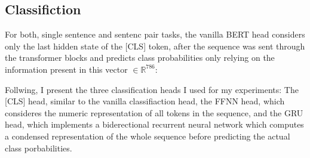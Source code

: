 \subsection{Classifiction}






For both, single sentence and sentenc pair tasks, the vanilla BERT head considers
only the last hidden state of the [CLS] token, after the sequence was sent through
the transformer blocks and predicts class probabilities only relying on the
information present in this vector $\in \mathbb{R}^{786}$:


Follwing, I present the three classification heads I used for my experiments: The [CLS]
head, similar to the vanilla classifiaction head, the FFNN head, which consideres the
numeric representation of all tokens in the sequence, and the GRU head, which implements
a biderectional recurrent neural network which computes a condensed representation of
the whole sequence before predicting the actual class porbabilities.



